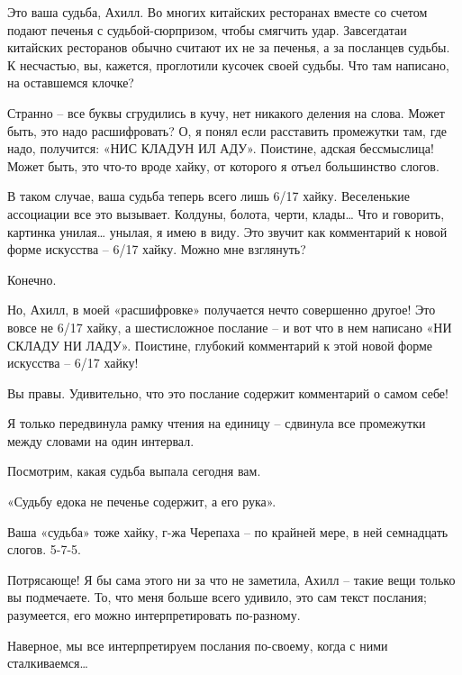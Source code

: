 \documentclass[../main.tex]{subfiles}
\begin{document}
\begin{dialogue}
 Это ваша судьба, Ахилл. Во многих китайских ресторанах вместе со счетом подают печенья с судьбой-сюрпризом, чтобы смягчить удар. Завсегдатаи китайских ресторанов обычно считают их не за печенья, а за посланцев судьбы. К несчастью, вы, кажется, проглотили кусочек своей судьбы. Что там написано, на оставшемся клочке?

 Странно \--- все буквы сгрудились в кучу, нет никакого деления на слова. Может быть, это надо расшифровать? О, я понял если расставить промежутки там, где надо, получится: «НИС КЛАДУН ИЛ АДУ». Поистине, адская бессмыслица! Может быть, это что-то вроде хайку, от которого я отъел большинство слогов.

 В таком случае, ваша судьба теперь всего лишь 6/17 хайку. Веселенькие ассоциации все это вызывает. Колдуны, болота, черти, клады\ldots{} Что и говорить, картинка унилая\ldots{} унылая, я имею в виду. Это звучит как комментарий к новой форме искусства \--- 6/17 хайку. Можно мне взглянуть?

 Конечно.

 Но, Ахилл, в моей «расшифровке» получается нечто совершенно другое! Это вовсе не 6/17 хайку, а шестисложное послание \--- и вот что в нем написано «НИ СКЛАДУ НИ ЛАДУ». Поистине, глубокий комментарий к этой новой форме искусства \--- 6/17 хайку!

 Вы правы. Удивительно, что это послание содержит комментарий о самом себе!

 Я только передвинула рамку чтения на единицу \--- сдвинула все промежутки между словами на один интервал.

 Посмотрим, какая судьба выпала сегодня вам.

 «Судьбу едока не печенье содержит, а его рука».

 Ваша «судьба» тоже хайку, г-жа Черепаха \--- по крайней мере, в ней семнадцать слогов. 5-7-5.

 Потрясающе! Я бы сама этого ни за что не заметила, Ахилл \--- такие вещи только вы подмечаете. То, что меня больше всего удивило, это сам текст послания; разумеется, его можно интерпретировать по-разному.

 Наверное, мы все интерпретируем послания по-своему, когда с ними сталкиваемся\ldots{}



\end{dialogue}
\end{document}
